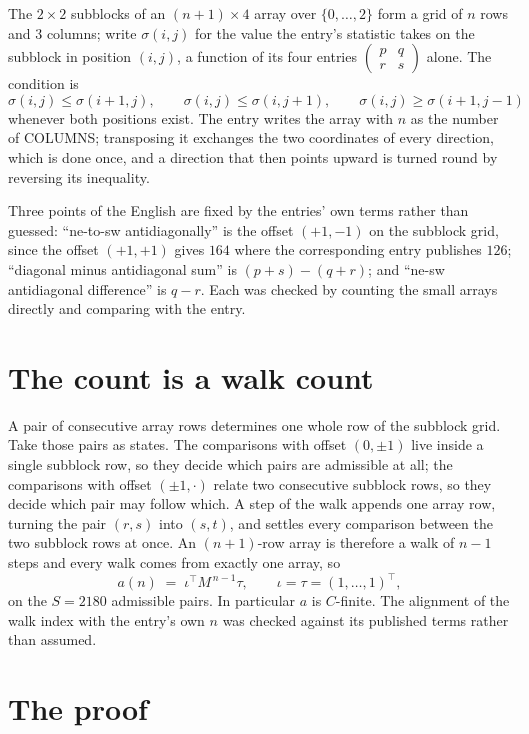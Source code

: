 \documentclass[11pt,a4paper]{article}
\theoremstyle{plain}
\theoremstyle{definition}
\begin{document}
The $2\times2$ subblocks of an $(n+1)\times4$ array over $\{0,\dots,2\}$ form a grid
of $n$ rows and $3$ columns; write $\sigma(i,j)$ for the value the entry's statistic takes on
the subblock in position $(i,j)$, a function of its four entries
$\begin{pmatrix}p&q\\r&s\end{pmatrix}$ alone. The condition is
\[
\sigma(i,j)\le\sigma(i+1,j),\qquad \sigma(i,j)\le\sigma(i,j+1),\qquad \sigma(i,j)\ge\sigma(i+1,j-1)
\]
whenever both positions exist. The entry writes the array with $n$ as the number of COLUMNS; transposing it exchanges the two coordinates of every direction, which is done once, and a direction that then points upward is turned round by reversing its inequality.

Three points of the English are fixed by the entries' own terms rather than guessed:
``ne-to-sw antidiagonally'' is the offset $(+1,-1)$ on the subblock grid, since the offset
$(+1,+1)$ gives $164$ where the corresponding entry publishes $126$; ``diagonal minus
antidiagonal sum'' is $(p+s)-(q+r)$; and ``ne-sw antidiagonal difference'' is $q-r$. Each was
checked by counting the small arrays directly and comparing with the entry.

\section{The count is a walk count}

A pair of consecutive array rows determines one whole row of the subblock grid. Take those
pairs as states. The comparisons with offset $(0,\pm1)$ live inside a single subblock row, so
they decide which pairs are admissible at all; the comparisons with offset $(\pm1,\cdot)$
relate two consecutive subblock rows, so they decide which pair may follow which. A step of the
walk appends one array row, turning the pair $(r,s)$ into $(s,t)$, and settles every comparison
between the two subblock rows at once. An $(n+1)$-row array is therefore a walk of $n-1$ steps
and every walk comes from exactly one array, so
\[
a(n)\;=\;\iota^{\!\top}M^{\,n-1}\tau,\qquad \iota=\tau=(1,\dots,1)^{\!\top},
\]
on the $S=2180$ admissible pairs. In particular $a$ is $C$-finite. The alignment of the walk
index with the entry's own $n$ was checked against its published terms rather than assumed.

\section{The proof}
\end{document}
